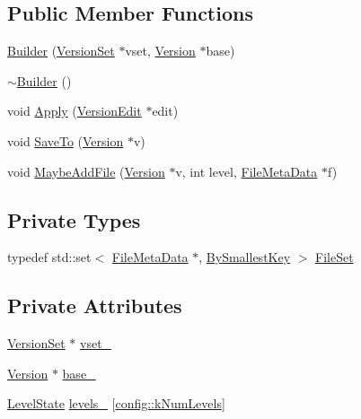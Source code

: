 \subsection*{Public Member Functions}
\begin{DoxyCompactItemize}
\item 
\hyperlink{classleveldb_1_1_version_set_1_1_builder_a19d0dd9aec1b825e7d938e9ac24dc4f7}{Builder} (\hyperlink{classleveldb_1_1_version_set}{Version\+Set} $\ast$vset, \hyperlink{classleveldb_1_1_version}{Version} $\ast$base)
\item 
\hyperlink{classleveldb_1_1_version_set_1_1_builder_acd7047ca78d8c654967101f53d10792c}{$\sim$\+Builder} ()
\item 
void \hyperlink{classleveldb_1_1_version_set_1_1_builder_aef505b4363ebc56b8fa5deb55087993f}{Apply} (\hyperlink{classleveldb_1_1_version_edit}{Version\+Edit} $\ast$edit)
\item 
void \hyperlink{classleveldb_1_1_version_set_1_1_builder_a429b23cc022cac08ab2ba880ac5803d1}{Save\+To} (\hyperlink{classleveldb_1_1_version}{Version} $\ast$v)
\item 
void \hyperlink{classleveldb_1_1_version_set_1_1_builder_aa90e0d9d0f8e05b8bcfa879d4f4a88c6}{Maybe\+Add\+File} (\hyperlink{classleveldb_1_1_version}{Version} $\ast$v, int level, \hyperlink{structleveldb_1_1_file_meta_data}{File\+Meta\+Data} $\ast$f)
\end{DoxyCompactItemize}
\subsection*{Private Types}
\begin{DoxyCompactItemize}
\item 
typedef std\+::set$<$ \hyperlink{structleveldb_1_1_file_meta_data}{File\+Meta\+Data} $\ast$, \hyperlink{structleveldb_1_1_version_set_1_1_builder_1_1_by_smallest_key}{By\+Smallest\+Key} $>$ \hyperlink{classleveldb_1_1_version_set_1_1_builder_add38ea04d208ebaa9b486597c7b6246a}{File\+Set}
\end{DoxyCompactItemize}
\subsection*{Private Attributes}
\begin{DoxyCompactItemize}
\item 
\hyperlink{classleveldb_1_1_version_set}{Version\+Set} $\ast$ \hyperlink{classleveldb_1_1_version_set_1_1_builder_a96967ae813b41ac070e8a9ea3df0dd7c}{vset\+\_\+}
\item 
\hyperlink{classleveldb_1_1_version}{Version} $\ast$ \hyperlink{classleveldb_1_1_version_set_1_1_builder_a473a78b62dff568cb0304aa914c8a1d8}{base\+\_\+}
\item 
\hyperlink{structleveldb_1_1_version_set_1_1_builder_1_1_level_state}{Level\+State} \hyperlink{classleveldb_1_1_version_set_1_1_builder_ad11ed07449801fd19dd721b7b710d067}{levels\+\_\+} \mbox{[}\hyperlink{namespaceleveldb_1_1config_ab6017947ae68898c606643bddc0f5b9c}{config\+::k\+Num\+Levels}\mbox{]}
\end{DoxyCompactItemize}


